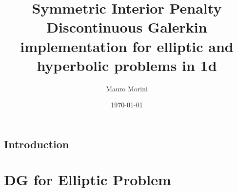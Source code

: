 \documentclass[12pt]{report}   %
\title{Symmetric Interior Penalty Discontinuous Galerkin implementation for elliptic and hyperbolic problems in 1d}
\author{Mauro Morini}
\date{\today}
\begin{document}
\maketitle
\tableofcontents

\section{Introduction}


\chapter{DG for Elliptic Problem}




\end{document}
